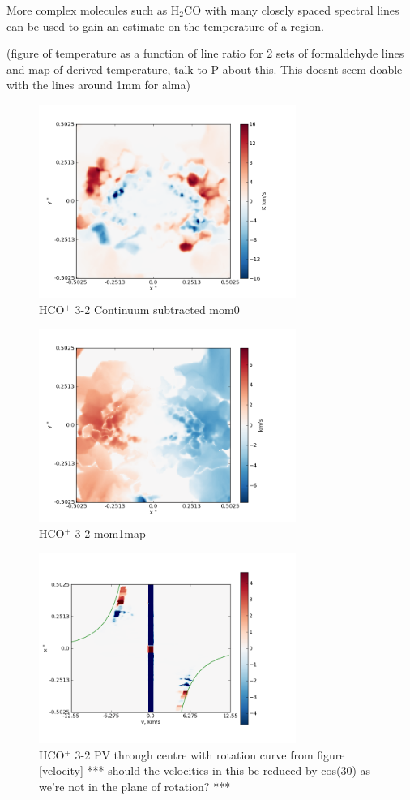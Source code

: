 \documentclass[useAMS,usenatbib]{mn2e}
\begin{document}
More complex molecules such as H$_2$CO with many closely spaced spectral lines can be used to gain an estimate on the temperature of a region. 

(figure of temperature as a function of line ratio for 2 sets of formaldehyde lines and map of derived temperature, talk to P about this. This doesnt seem doable with the lines around 1mm for alma)\newline

\begin{figure}
 \includegraphics[width=84mm]{Figures/sim/imageHCOp_3-2_30deg_contSub.png}

 \caption{HCO$^+$ 3-2 Continuum subtracted mom0}
\end{figure}

\begin{figure}
 \includegraphics[width=84mm]{Figures/sim/imageHCOp_3-2_30deg_mom1.png}

 \caption{HCO$^+$ 3-2 mom1map}
\end{figure}

\begin{figure}
 \includegraphics[width=84mm]{Figures/sim/imageHCOp_3-2_30deg_PV_centre_2.png}

 \caption{HCO$^+$ 3-2 PV through centre with rotation curve from figure \ref{velocity} *** should the velocities in this be reduced by cos(30) as we're not in the plane of rotation? ***}
\end{figure}
\end{document}
